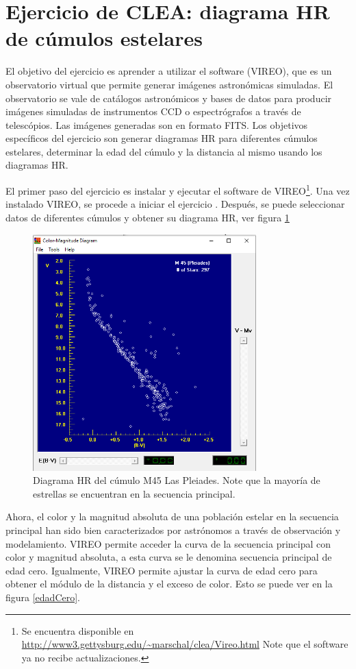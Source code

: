 \documentclass[12pt]{article}
\begin{document}
\section{Ejercicio de CLEA: diagrama HR de cúmulos estelares}
El objetivo del ejercicio es aprender a utilizar el software  (VIREO), que es un observatorio virtual que permite generar imágenes astronómicas simuladas.
El observatorio se vale de catálogos astronómicos y bases de datos para producir imágenes simuladas de instrumentos CCD o espectrógrafos a través de telescópios.
Las imágenes generadas son en formato FITS.
Los objetivos específicos del ejercicio son generar diagramas HR para diferentes cúmulos estelares, determinar la edad del cúmulo y la distancia al mismo usando los diagramas HR.

El primer paso del ejercicio es instalar y ejecutar el software de VIREO\footnote{Se encuentra disponible en \url{http://www3.gettysburg.edu/~marschal/clea/Vireo.html} Note que el software ya no recibe actualizaciones.}.
Una vez instalado VIREO, se procede a iniciar el ejercicio . Después, se puede seleccionar datos de diferentes cúmulos y obtener su diagrama HR, ver figura \ref{vireaohr}

\begin{figure}[H]
  \centering
   \includegraphics[width= 3.40in]{hrvireo.png}
  \caption{Diagrama HR del cúmulo M45 Las Pleiades. Note que la mayoría de estrellas se encuentran en la secuencia principal.}
  \label{vireaohr}
\end{figure}

Ahora, el color y la magnitud absoluta de una población estelar en la secuencia principal han sido bien caracterizados por astrónomos a través de observación y modelamiento. VIREO permite acceder la curva de la secuencia principal con color y magnitud absoluta, a esta curva se le denomina secuencia principal de edad cero. Igualmente, VIREO permite ajustar la  curva de edad cero para obtener el módulo de la distancia y el exceso de color. Esto se puede ver en la figura \ref{edadCero}.
\end{document}
